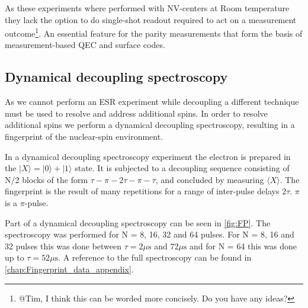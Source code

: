 As these experiments where performed with NV-centers at Room temperature they lack the option to do single-shot readout required to act on a measurement outcome\footnote{@Tim, I think this can be worded more concisely. Do you have any ideas?}. An essential feature for the parity measurements that form the basis of measurement-based QEC and surface codes.

\subsection{Dynamical decoupling spectroscopy}
As we cannot perform an ESR experiment while decoupling a different technique must be used to resolve and address additional spins.
In order to resolve additional spins we perform a dynamical decoupling spectroscopy, resulting in a fingerprint of the nuclear-spin environment\citep{Taminiau2012Detection}.

In a dynamical decoupling spectroscopy experiment the electron is prepared in the $|X\rangle = |0\rangle +|1\rangle$ state. It is subjected to a decoupling sequence consisting of N/2 blocks of the form {$\tau - \pi -2\tau-\pi-\tau$}, and concluded by measuring $\langle X\rangle $. The fingerprint is the result of many repetitions for a range of inter-pulse delays $2\tau$. $\pi$ is a $\pi$-pulse.

Part of a dynamical decoupling spectroscopy can be seen in \cref{fig:FP}. The spectroscopy was performed for N = 8, 16, 32 and 64 pulses. For N = 8, 16 and 32 pulses this was done between $\tau = 2 \mu \mathrm{s}$  and $72 \mu \mathrm{s}$ and for N = 64 this was done up to $\tau = 52 \mu \mathrm{s}$. A reference to the full spectroscopy can be found in \cref{chap:Fingerprint_data_appendix}.

